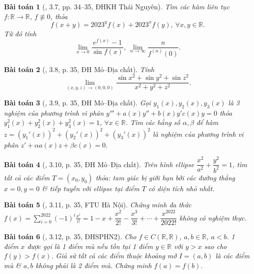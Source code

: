 \documentclass{article}
\newtheorem{baitoan}{Bài toán}
\begin{document}
\begin{baitoan}[\cite{VMS_VMC2023}, 3.7, pp. 34--35, ĐHKH Thái Nguyên]
	Tìm các hàm liên tục $f:\mathbb{R}\to\mathbb{R}$, $f\not\equiv0$, thỏa
	\begin{equation*}
		f(x + y) = 2023^yf(x) + 2023^xf(y),\ \forall x,y\in\mathbb{R}.
	\end{equation*}
	Từ đó tính
	\begin{equation*}
		\lim_{x\to0} \frac{e^{f(x)} - 1}{\sin f(x)},\ \lim_{n\to\infty} \frac{n}{f^{(n)}(0)}.
	\end{equation*}
\end{baitoan}

\begin{baitoan}[\cite{VMS_VMC2023}, 3.8, p. 35, ĐH Mỏ--Địa chất]
	Tính
	\begin{equation*}
		\lim_{(x,y,z)\to(0,0,0)} \frac{\sin x^2 + \sin y^2 + \sin z^2}{x^2 + y^2 + z^2}.
	\end{equation*}
\end{baitoan}

\begin{baitoan}[\cite{VMS_VMC2023}, 3.9, p. 35, ĐH Mỏ--Địa chất]
	Gọi $y_1(x),y_2(x),y_3(x)$ là 3 nghiệm của phương trình vi phân $y''' + a(x)y'' + b(x)y' c(x)y = 0$ thỏa $y_1^2(x) + y_2^2(x) + y_3^2(x) = 1$, $\forall x\in\mathbb{R}$. Tìm các hằng số $\alpha,\beta$ để hàm $z = (y_1'(x))^2 + (y_2'(x))^2 + (y_3'(x))^2$ là nghiệm của phương trình vi phân $z' + \alpha a(x)z + \beta c(x) = 0$.
\end{baitoan}

\begin{baitoan}[\cite{VMS_VMC2023}, 3.10, p. 35, ĐH Mỏ--Địa chất]
	Trên hình ellipse $\dfrac{x^2}{a^2} + \dfrac{y^2}{b^2} = 1$, tìm tất cả các điểm $T = (x_0,y_0)$ thỏa: tam giác bị giới hạn bởi các đường thẳng $x = 0,y = 0$ \& tiếp tuyến với ellipse tại điểm $T$ có diện tích nhỏ nhất.
\end{baitoan}

\begin{baitoan}[\cite{VMS_VMC2023}, 3.11, p. 35, FTU Hà Nội]
	Chứng minh đa thức $f(x) = \sum_{i=0}^{2022} (-1)^i\frac{x^i}{i!} = 1 - x + \dfrac{x^2}{2!} - \dfrac{x^3}{3!} + \cdots + \dfrac{x^{2022}}{2022!}$ không có nghiệm thực.
\end{baitoan}

\begin{baitoan}[\cite{VMS_VMC2023}, 3.12, p. 35, ĐHSPHN2]
	Cho $f\in C(\mathbb{R},\mathbb{R})$, $a,b\in\mathbb{R}$, $a < b$. 1 điểm $x$ được gọi là 1 {\rm điểm mù} nếu tồn tại 1 điểm $y\in\mathbb{R}$ với $y > x$ sao cho $f(y) > f(x)$. Giả sử tất cả các điểm thuộc khoảng mở $I = (a,b)$ là các điểm mù \& $a,b$ không phải là 2 điểm mù. Chứng minh $f(a) = f(b)$.
\end{baitoan}
\end{document}
